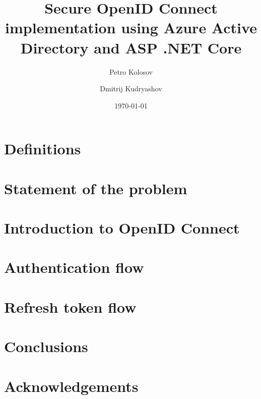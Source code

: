 \documentclass[12pt,letterpaper,oneside,reqno]{amsart}
\title[Secure OIDC implementation using Azure AD and ASP .NET Core]
{Secure OpenID Connect implementation using Azure Active Directory and ASP .NET Core}
\author[Petro Kolosov]{Petro Kolosov}
\author[Dmitrij Kudryashov]{Dmitrij Kudryashov}
\date{\today}
\numberwithin{equation}{section}
\begin{document}
    \begin{abstract}
        
    \end{abstract}

    \maketitle

    \tableofcontents


    \section{Definitions}\label{sec:definitions}
    


    \section{Statement of the problem}\label{sec:statement-of-the-problem}
    


    \section{Introduction to OpenID Connect}\label{sec:introduction-to-open-id-connect}
    


    \section{Authentication flow}\label{sec:authentication-flow}
    


    \section{Refresh token flow}\label{sec:refresh-token-flow}
    


    \section{Conclusions}\label{sec:conclusions}
    


    \section{Acknowledgements}\label{sec:acknowledgements}
    

    
    
\end{document}
